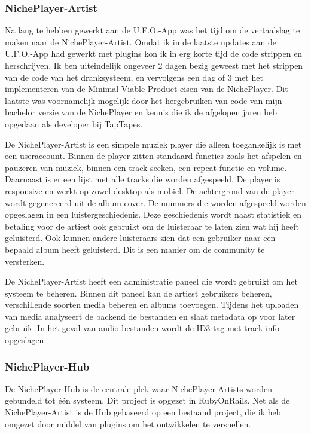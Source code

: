 \subsubsection*{NichePlayer-Artist}
Na lang te hebben gewerkt aan de U.F.O.-App was het tijd om de vertaalslag te maken naar de NichePlayer-Artist. Omdat ik in de laatste updates aan de U.F.O.-App had gewerkt met plugins kon ik in erg korte tijd de code strippen en herschrijven. Ik ben uiteindelijk ongeveer 2 dagen bezig geweest met het strippen van de code van het dranksysteem, en vervolgens een dag of 3 met het implementeren van de Minimal Viable Product eisen van de NichePlayer. Dit laatste was voornamelijk mogelijk door het hergebruiken van code van mijn bachelor versie van de NichePlayer en kennis die ik de afgelopen jaren heb opgedaan als developer bij TapTapes.

De NichePlayer-Artist is een simpele muziek player die alleen toegankelijk is met een useraccount. Binnen de player zitten standaard functies zoals het afspelen en pauzeren van muziek, binnen een track seeken, een repeat functie en volume. Daarnaast is er een lijst met alle tracks die worden afgespeeld. De player is responsive en werkt op zowel desktop als mobiel. De achtergrond van de player wordt gegenereerd uit de album cover. De nummers die worden afgespeeld worden opgeslagen in een luistergeschiedenis. Deze geschiedenis wordt naast statistiek en betaling voor de artiest ook gebruikt om de luisteraar te laten zien wat hij heeft geluisterd. Ook kunnen andere luisteraars zien dat een gebruiker naar een bepaald album heeft geluisterd. Dit is een manier om de community te versterken.

De NichePlayer-Artist heeft een administratie paneel die wordt gebruikt om het systeem te beheren. Binnen dit paneel kan de artiest gebruikers beheren, verschillende soorten media beheren en albums toevoegen. Tijdens het uploaden van media analyseert de backend de bestanden en slaat metadata op voor later gebruik. In het geval van audio bestanden wordt de ID3 tag met track info opgeslagen.

\subsubsection*{NichePlayer-Hub}
De NichePlayer-Hub is de centrale plek waar NichePlayer-Artists worden gebundeld tot één systeem. Dit project is opgezet in RubyOnRails. Net als de NichePlayer-Artist is de Hub gebaseerd op een bestaand project, die ik heb omgezet door middel van plugins om het ontwikkelen te versnellen.

